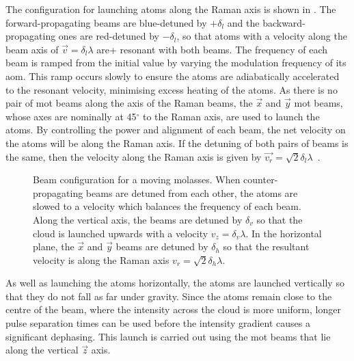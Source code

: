 The configuration for launching atoms along the Raman axis is shown in
. The forward-propagating beams are
blue-detuned by \(+\delta_l\) and the backward-propagating ones are
red-detuned by \(-\delta_l\), so that atoms with a velocity along the
beam axis of \(\vec{v} = \delta_l \lambda\) are+ resonant with both
beams. The frequency of each beam is ramped from the initial value by
varying the modulation frequency of its \ac{aom}. This ramp occurs
slowly to ensure the atoms are adiabatically accelerated to the
resonant velocity, minimising excess heating of the atoms. As there is
no pair of \ac{mot} beams along the axis of the Raman beams, the
\(\vec{x}\) and \(\vec{y}\) \ac{mot} beams, whose axes are nominally
at 45\(^{\circ}\) to the Raman axis, are used to launch the atoms. By
controlling the power and alignment of each beam, the net velocity on
the atoms will be along the Raman axis. If the detuning of both pairs
of beams is the same, then the velocity along the Raman axis is given
by \(\vec{v_r} = \sqrt{2} \delta_l \lambda\)~\cite{Ohshima1995}.
\begin{figure}[!htbp]
    \centering
    \def\svgwidth{0.6\textwidth}
    \caption[Beam configuration for a moving molasses]{Beam configuration for a moving molasses. When counter-propagating beams are detuned from each other, the atoms are slowed to a velocity which balances the frequency of each beam. Along the vertical axis, the beams are detuned by \(\delta_v\) so that the cloud is launched upwards with a velocity \(v_z = \delta_v \lambda\). In the horizontal plane, the \(\vec{x}\) and \(\vec{y}\) beams are detuned by \(\delta_h\) so that the resultant velocity is along the Raman axis \(v_r = \sqrt{2}\delta_h\lambda\). }
    \label{fig:moving_molasses}
\end{figure}
\par\noindent
As well as launching the atoms horizontally, the atoms are launched
vertically so that they do not fall as far under gravity. Since the
atoms remain close to the centre of the beam, where the intensity
across the cloud is more uniform, longer pulse separation times can be
used before the intensity gradient causes a significant dephasing.
This launch is carried out using the \ac{mot} beams that lie along the
vertical \(\vec{z}\) axis. 
\par\noindent
